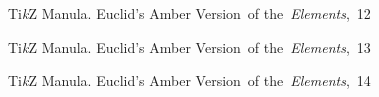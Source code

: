 \documentclass[a4paper,11pt]{article}
\begin{document}
\begin{figure}[ht]

  \centering

  \begin{tikzpicture}










  \end{tikzpicture}

  \caption{Ti\textit{k}Z Manula. Euclid's Amber Version~of
    the~\textit{Elements},~12}

\end{figure}





\begin{figure}[ht]

  \centering

  \begin{tikzpicture}

















  \end{tikzpicture}

  \caption{Ti\textit{k}Z Manula. Euclid's Amber Version~of
    the~\textit{Elements},~13}

\end{figure}





\begin{figure}[ht]

  \centering

  \begin{tikzpicture}














  \end{tikzpicture}

  \caption{Ti\textit{k}Z Manula. Euclid's Amber Version~of
    the~\textit{Elements},~14}

\end{figure}
\end{document}
